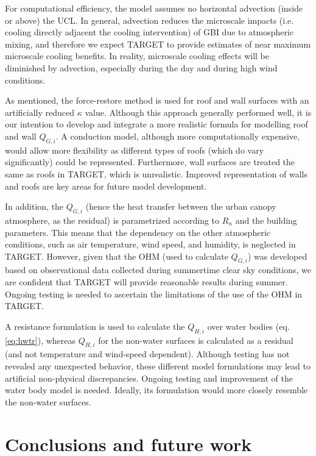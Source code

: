 \documentclass[journal abbreviation, manuscript]{copernicus}
\begin{document}
For computational efficiency, the model assumes no horizontal advection (inside or above) the UCL. In general, advection reduces the microscale impacts (i.e. cooling directly adjacent the cooling intervention) of GBI due to atmospheric mixing, and therefore we expect TARGET to provide estimates of near maximum microscale cooling benefits. In reality, microscale cooling effects will be diminished by advection, especially during the day and during high wind conditions.

As mentioned, the force-restore method is used for roof and wall surfaces with an artificially reduced \ensuremath{\kappa} value. Although this approach generally performed well, it is our intention to develop and integrate a more realistic formula for modelling roof and wall \ensuremath{Q_{G,i}}. A conduction model, although more computationally expensive, would allow more flexibility as different types of roofs (which do vary significantly) could be represented. Furthermore, wall surfaces are treated the same as roofs in TARGET, which is unrealistic. Improved representation of walls and roofs are key areas for future model development.  
 

In addition, 
the \ensuremath{Q_{G,i}} (hence the heat transfer between the urban canopy  atmosphere, as the residual) is parametrized according to \ensuremath{R_{n}} and the building parameters. This means that the dependency on the other atmospheric conditions, such as air temperature, wind speed, and humidity, is neglected in TARGET. However, given that the OHM  (used to calculate \ensuremath{Q_{G,i}}) was developed based on observational data collected during summertime clear sky conditions, we are confident that TARGET will provide reasonable results during summer. Ongoing testing is needed to ascertain the limitations of the use of the OHM in TARGET. 

A resistance formulation  is used to calculate the \ensuremath{Q_{H,i}} over water bodies (eq. \ref{eq:hwtr}), whereas \ensuremath{Q_{H,i}} for the non-water surfaces is calculated as a residual (and not temperature and wind-speed dependent). Although testing has not revealed any  unexpected behavior, these different model formulations may  lead to artificial non-physical discrepancies. Ongoing testing and improvement of the water body model is needed. Ideally, its formulation would more closely resemble the non-water surfaces. 

\section{Conclusions and future work}\label{sec:conclusion}
\end{document}
